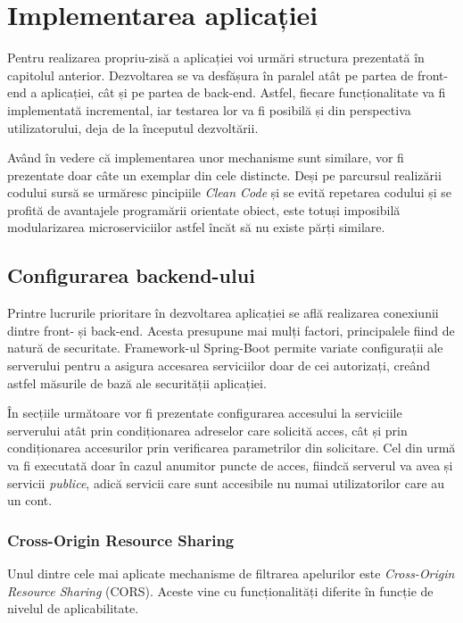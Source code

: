 \documentclass[12pt,a4paper]{report}
\theoremstyle{definition}
\theoremstyle{remark}
\begin{document}
\chapter{Implementarea aplicației}
\par Pentru realizarea propriu-zisă a aplicației voi urmări structura prezentată în capitolul anterior. Dezvoltarea se va desfășura în paralel atât pe partea de front-end a aplicației, cât și pe partea de back-end. Astfel, fiecare funcționalitate va fi implementată incremental, iar testarea lor va fi posibilă și din perspectiva utilizatorului, deja de la începutul dezvoltării.

\par Având în vedere că implementarea unor mechanisme sunt similare, vor fi prezentate doar câte un exemplar din cele distincte. Deși pe parcursul realizării codului sursă se urmăresc pincipiile \textit{Clean Code}\cite{martin2009clean} și se evită repetarea codului și se profită de avantajele programării orientate obiect, este totuși imposibilă modularizarea microserviciilor astfel încăt să nu existe părți similare.

\section{Configurarea backend-ului}
\par Printre lucrurile prioritare în dezvoltarea aplicației se află realizarea conexiunii dintre front- și back-end. Acesta presupune mai mulți factori, principalele fiind de natură de securitate. Framework-ul Spring-Boot permite variate configurații ale serverului pentru a asigura accesarea serviciilor doar de cei autorizați, creând astfel măsurile de bază ale securității aplicației\cite{scarioni2019pro}.

\par În secțiile următoare vor fi prezentate configurarea accesului la serviciile serverului atât prin condiționarea adreselor care solicită acces, cât și prin condiționarea accesurilor prin verificarea parametrilor din solicitare. Cel din urmă va fi executată doar în cazul anumitor puncte de acces, fiindcă serverul va avea și servicii \textit{publice}, adică servicii care sunt accesibile nu numai utilizatorilor care au un cont.

\subsection{Cross-Origin Resource Sharing}
\par Unul dintre cele mai aplicate mechanisme de filtrarea apelurilor este \textit{Cross-Origin Resource Sharing}\cite{gibbinscross} (CORS). Aceste vine cu funcționalități diferite în funcție de nivelul de aplicabilitate.
\end{document}
